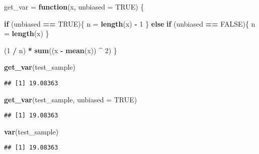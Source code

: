 \documentclass[]{book}
\newenvironment{Shaded}{\begin{snugshade}}{\end{snugshade}}
\newcommand{\KeywordTok}[1]{\textcolor[rgb]{0.13,0.29,0.53}{\textbf{#1}}}
\newcommand{\DataTypeTok}[1]{\textcolor[rgb]{0.13,0.29,0.53}{#1}}
\newcommand{\DecValTok}[1]{\textcolor[rgb]{0.00,0.00,0.81}{#1}}
\newcommand{\StringTok}[1]{\textcolor[rgb]{0.31,0.60,0.02}{#1}}
\newcommand{\OtherTok}[1]{\textcolor[rgb]{0.56,0.35,0.01}{#1}}
\newcommand{\ControlFlowTok}[1]{\textcolor[rgb]{0.13,0.29,0.53}{\textbf{#1}}}
\newcommand{\OperatorTok}[1]{\textcolor[rgb]{0.81,0.36,0.00}{\textbf{#1}}}
\newcommand{\NormalTok}[1]{#1}
\begin{document}
\begin{Shaded}
\begin{Highlighting}[]
\NormalTok{get_var =}\StringTok{ }\ControlFlowTok{function}\NormalTok{(x, }\DataTypeTok{unbiased =} \OtherTok{TRUE}\NormalTok{) \{}

  \ControlFlowTok{if}\NormalTok{ (unbiased }\OperatorTok{==}\StringTok{ }\OtherTok{TRUE}\NormalTok{)\{}
\NormalTok{    n =}\StringTok{ }\KeywordTok{length}\NormalTok{(x) }\OperatorTok{-}\StringTok{ }\DecValTok{1}
\NormalTok{  \} }\ControlFlowTok{else} \ControlFlowTok{if}\NormalTok{ (unbiased }\OperatorTok{==}\StringTok{ }\OtherTok{FALSE}\NormalTok{)\{}
\NormalTok{    n =}\StringTok{ }\KeywordTok{length}\NormalTok{(x) }
\NormalTok{   \}}

\NormalTok{  (}\DecValTok{1} \OperatorTok{/}\StringTok{ }\NormalTok{n) }\OperatorTok{*}\StringTok{ }\KeywordTok{sum}\NormalTok{((x }\OperatorTok{-}\StringTok{ }\KeywordTok{mean}\NormalTok{(x)) }\OperatorTok{^}\StringTok{ }\DecValTok{2}\NormalTok{)}
\NormalTok{\}}
\end{Highlighting}
\end{Shaded}

\begin{Shaded}
\begin{Highlighting}[]
\KeywordTok{get_var}\NormalTok{(test_sample)}
\end{Highlighting}
\end{Shaded}

\begin{verbatim}
## [1] 19.08363
\end{verbatim}

\begin{Shaded}
\begin{Highlighting}[]
\KeywordTok{get_var}\NormalTok{(test_sample, }\DataTypeTok{unbiased =} \OtherTok{TRUE}\NormalTok{)}
\end{Highlighting}
\end{Shaded}

\begin{verbatim}
## [1] 19.08363
\end{verbatim}

\begin{Shaded}
\begin{Highlighting}[]
\KeywordTok{var}\NormalTok{(test_sample)}
\end{Highlighting}
\end{Shaded}

\begin{verbatim}
## [1] 19.08363
\end{verbatim}
\end{document}
